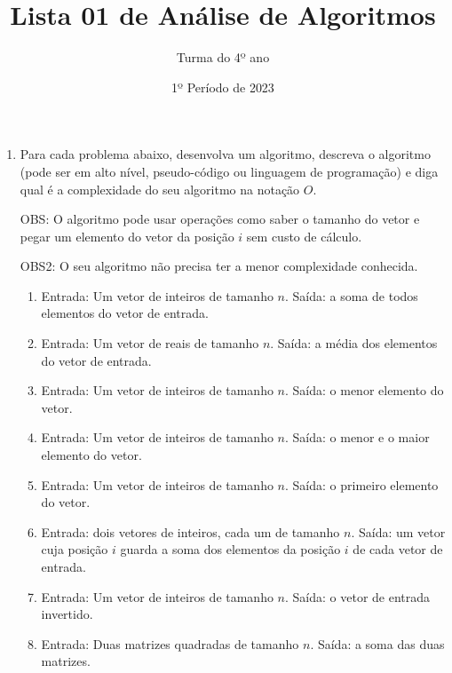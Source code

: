 \documentclass[12pt]{article}
\title{Lista 01 de Análise de Algoritmos}
\date{1º Período de 2023}
\author{Turma do 4º ano}
\begin{document}
 

\maketitle

\vspace{3em}



\begin{enumerate}

\item Para cada problema abaixo, desenvolva um algoritmo, descreva o algoritmo (pode ser em alto nível, pseudo-código ou linguagem de programação) e diga qual é a complexidade do seu algoritmo na notação $O$.

OBS: O algoritmo pode usar operações como saber o tamanho do vetor e pegar um elemento do vetor da posição $i$ sem custo de cálculo.

OBS2: O seu algoritmo não precisa ter a menor complexidade conhecida.

\begin{enumerate}

\item Entrada: Um vetor de inteiros de tamanho $n$. Saída: a soma de todos elementos do vetor de entrada.

\item Entrada: Um vetor de reais de tamanho $n$. Saída: a média dos elementos do vetor de entrada.

\item Entrada: Um vetor de inteiros de tamanho $n$. Saída: o menor elemento do vetor.

\item Entrada: Um vetor de inteiros de tamanho $n$. Saída: o menor e o maior elemento do vetor.

\item Entrada: Um vetor de inteiros de tamanho $n$. Saída: o primeiro elemento do vetor.

\item Entrada: dois vetores de inteiros, cada um de tamanho $n$. Saída: um vetor cuja posição $i$ guarda a soma dos elementos da posição $i$ de cada vetor de entrada.

\item Entrada: Um vetor de inteiros de tamanho $n$. Saída: o vetor de entrada invertido.

\item Entrada: Duas matrizes quadradas de tamanho $n$. Saída: a soma das duas matrizes.


\end{enumerate}
\end{enumerate}
\end{document}
